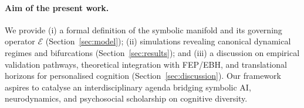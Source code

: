 \paragraph{Aim of the present work.}
We provide (i) a formal definition of the symbolic manifold and its governing operator $\mathcal{E}$ (Section~\ref{sec:model}); (ii) simulations revealing canonical dynamical regimes and bifurcations (Section~\ref{sec:results}); and (iii) a discussion on empirical validation pathways, theoretical integration with FEP/EBH, and translational horizons for personalised cognition (Section~\ref{sec:discussion}). Our framework aspires to catalyse an interdisciplinary agenda bridging symbolic AI, neurodynamics, and psychosocial scholarship on cognitive diversity.